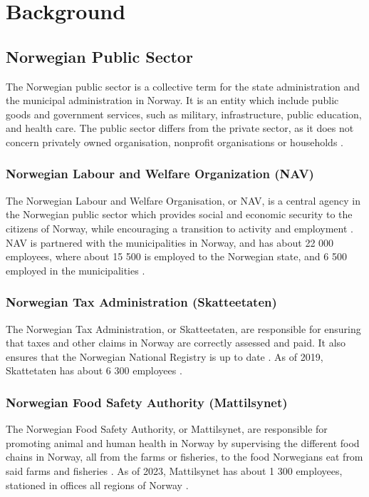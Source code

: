 \chapter{Background}

\section{Norwegian Public Sector}
The Norwegian public sector is a collective term for the state administration and the municipal administration in Norway. It is an entity which include public goods and government services, such as military, infrastructure, public education, and health care. The public sector differs from the private sector, as it does not concern privately owned organisation, nonprofit organisations or households \cite{os_snl_2022}\cite{ps_wiki_2023}.

\subsection{Norwegian Labour and Welfare Organization (NAV)}
The Norwegian Labour and Welfare Organisation, or NAV, is a central agency in the Norwegian public sector which provides social and economic security to the citizens of Norway, while encouraging a transition to activity and employment \cite{nav_r_2023}. NAV is partnered with the municipalities in Norway, and has about 22 000 employees, where about 15 500 is employed to the Norwegian state, and 6 500 employed in the municipalities \cite{org_nav_2023}. 

\subsection{Norwegian Tax Administration (Skatteetaten)}
The Norwegian Tax Administration, or Skatteetaten, are responsible for ensuring that taxes and other claims in Norway are correctly assessed and paid. It also ensures that the Norwegian National Registry is up to date \cite{skatt_r_2023}. As of 2019, Skattetaten has about 6 300 employees \cite{skatt_r_2023}. 

\subsection{Norwegian Food Safety Authority (Mattilsynet)}
The Norwegian Food Safety Authority, or Mattilsynet, are responsible for promoting animal and human health in Norway by supervising the different food chains in Norway, all from the farms or fisheries, to the food Norwegians eat from said farms and fisheries \cite{mat_r_2023}. As of 2023, Mattilsynet has about 1 300 employees, stationed in offices all regions of Norway \cite{org_mat_2023}.

